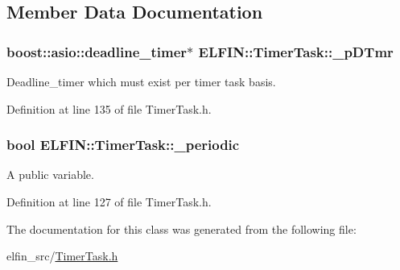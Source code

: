\subsection{Member Data Documentation}
\hypertarget{class_e_l_f_i_n_1_1_timer_task_a37355e38173dbba8a3cabe26bbe797bd}{
\subsubsection[{\-\_\-p\-D\-Tmr}]{\setlength{\rightskip}{0pt plus 5cm}boost\-::asio\-::deadline\-\_\-timer$\ast$ E\-L\-F\-I\-N\-::\-Timer\-Task\-::\-\_\-p\-D\-Tmr}}\label{class_e_l_f_i_n_1_1_timer_task_a37355e38173dbba8a3cabe26bbe797bd}
Deadline\-\_\-timer which must exist per timer task basis. 

Definition at line 135 of file Timer\-Task.\-h.

\hypertarget{class_e_l_f_i_n_1_1_timer_task_afe51cab64415197cd7cf98f4c95d6028}{
\subsubsection[{\-\_\-periodic}]{\setlength{\rightskip}{0pt plus 5cm}bool E\-L\-F\-I\-N\-::\-Timer\-Task\-::\-\_\-periodic\hspace{0.3cm}{\ttfamily [private]}}}\label{class_e_l_f_i_n_1_1_timer_task_afe51cab64415197cd7cf98f4c95d6028}


A public variable. 



Definition at line 127 of file Timer\-Task.\-h.



The documentation for this class was generated from the following file\-:\begin{DoxyCompactItemize}
\item 
elfin\-\_\-src/\hyperlink{_timer_task_8h}{Timer\-Task.\-h}\end{DoxyCompactItemize}
